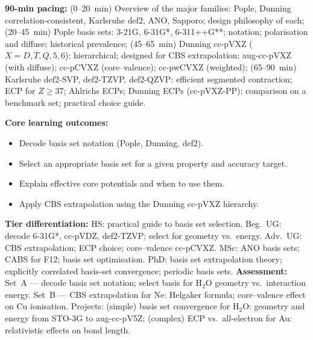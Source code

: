\documentclass[11pt,a4paper]{article}
\begin{document}
\begin{tcolorbox}[chembox, title={Module~III.2 / L14: Basis Sets II --- Standard Basis Families}]
\textbf{90-min pacing:} (0--20~min) Overview of the major families: Pople, Dunning correlation-consistent, Karlsruhe def2, ANO, Sapporo; design philosophy of each; (20--45~min) Pople basis sets: 3-21G, 6-31G*, 6-311++G**; notation; polarisation and diffuse; historical prevalence; (45--65~min) Dunning cc-pVXZ ($X=D,T,Q,5,6$): hierarchical; designed for CBS extrapolation; aug-cc-pVXZ (with diffuse); cc-pCVXZ (core--valence); cc-pwCVXZ (weighted); (65--90~min) Karlsruhe def2-SVP, def2-TZVP, def2-QZVP: efficient segmented contraction; ECP for $Z\geq37$; Ahlrichs ECPs; Dunning ECPs (cc-pVXZ-PP); comparison on a benchmark set; practical choice guide.

\medskip\textbf{Core learning outcomes:}
\begin{itemize}[leftmargin=1.4em,topsep=2pt,itemsep=1pt]
  \item Decode basis set notation (Pople, Dunning, def2).
  \item Select an appropriate basis set for a given property and accuracy target.
  \item Explain effective core potentials and when to use them.
  \item Apply CBS extrapolation using the Dunning cc-pVXZ hierarchy.
\end{itemize}
\medskip\textbf{Tier differentiation:}
HS: practical guide to basis set selection.
Beg.\ UG: decode 6-31G*, cc-pVDZ, def2-TZVP; select for geometry vs.\ energy.
Adv.\ UG: CBS extrapolation; ECP choice; core--valence cc-pCVXZ.
MSc: ANO basis sets; CABS for F12; basis set optimisation.
PhD: basis set extrapolation theory; explicitly correlated basis-set convergence; periodic basis sets.
\medskip\textbf{Assessment:}
Set~A --- decode basis set notation; select basis for H$_2$O geometry vs.\ interaction energy.
Set~B --- CBS extrapolation for Ne: Helgaker formula; core--valence effect on Cu ionisation.
Projects: (simple) basis set convergence for H$_2$O: geometry and energy from STO-3G to aug-cc-pV5Z; (complex) ECP vs.\ all-electron for Au: relativistic effects on bond length.
\end{tcolorbox}

\medskip
\end{document}
